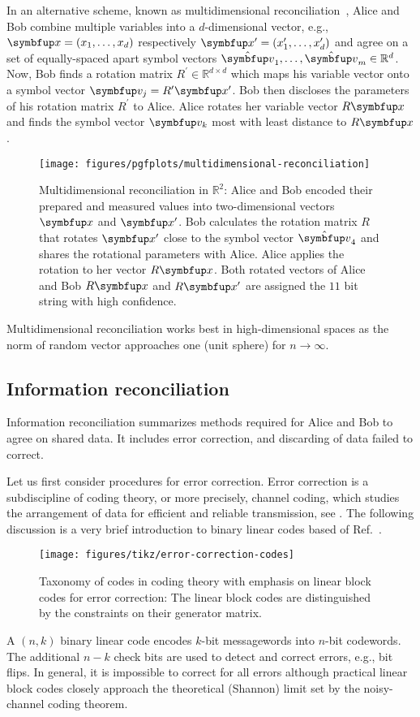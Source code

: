 In an alternative scheme, known as multidimensional reconciliation~\cite{Leverrier2008}, Alice and Bob combine multiple variables into a $d$-dimensional vector, e.g., $\vb{x}=(x_1,\dots,x_d)$ respectively $\vb{x}^\prime=(x_1^\prime,\dots,x_d^\prime)$ and agree on a set of equally-spaced apart symbol vectors $\vu{v}_1,\dots,\vu{v}_m\in\mathbb{R}^d$.
Now, Bob finds a rotation matrix $R^\prime\in\mathbb{R}^{d\times d}$ which maps his variable vector onto a symbol vector $\vb{v}_j=R^\prime\vb{x}^\prime$.
Bob then discloses the parameters of his rotation matrix $R^\prime$ to Alice.
Alice rotates her variable vector $R\vb{x}$ and finds the symbol vector $\vb{v}_k$ most with least distance to $R\vb{x}$.
\begin{figure}[htb]
	\centering
	\texttt{[image: figures/pgfplots/multidimensional-reconciliation]}
	\caption{Multidimensional reconciliation in $\mathbb{R}^2$: Alice and Bob encoded their prepared and measured values into two-dimensional vectors $\vb{x}$ and $\vb{x}^\prime$. Bob calculates the rotation matrix $R$ that rotates $\vb{x}^\prime$ close to the symbol vector $\vu{v}_4$ and shares the rotational parameters with Alice. Alice applies the rotation to her vector $R\vb{x}$. Both rotated vectors of Alice and Bob $R\vb{x}$ and $R\vb{x}^\prime$ are assigned the $11$ bit string with high confidence.}\label{fig:multidimensional_reconciliation}
\end{figure}
Multidimensional reconciliation works best in high-dimensional spaces as the norm of random vector approaches one (unit sphere) for $n\to\infty$.

\FloatBarrier
\subsection{Information reconciliation}

Information reconciliation summarizes methods required for Alice and Bob to agree on shared data.
It includes error correction, and discarding of data failed to correct.

Let us first consider procedures for error correction.
Error correction is a subdiscipline of coding theory, or more precisely, channel coding, which studies the arrangement of data for efficient and reliable transmission, see .
The following discussion is a very brief introduction to binary linear codes based of Ref.~\cite{MacKay2003,Mildenberger2013}.
\begin{figure}[htb]
	\centering
	\texttt{[image: figures/tikz/error-correction-codes]}
	\caption{Taxonomy of codes in coding theory with emphasis on linear block codes for error correction: The linear block codes are distinguished by the constraints on their generator matrix.}\label{fig:error_correction_codes}
\end{figure}
A $(n,k)$ binary linear code encodes $k$-bit messagewords into $n$-bit codewords.
The additional $n-k$ check bits are used to detect and correct errors, e.g., bit flips.
In general, it is impossible to correct for all errors although practical linear block codes closely approach the theoretical (Shannon) limit set by the noisy-channel coding theorem.

